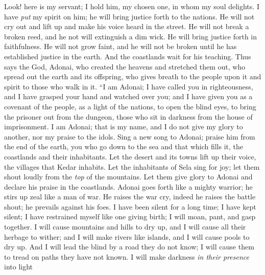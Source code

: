 \begin{biblechapter} %
 Look! here is my servant; I hold him, 
my chosen one, in whom my soul delights. 
I have \textit{put} my spirit on him; 
he will bring justice forth to the nations.
\verse He will not cry out and lift up 
and make his voice heard in the street.
\verse He will not break a broken reed, 
and he not will extinguish a dim wick. 
He will bring justice forth in faithfulness.
\verse He will not grow faint, 
and he will not be broken 
until he has established justice in the earth. 
And the coastlands wait for his teaching.
\verse Thus says the God, Adonai, 
who created the heavens 
and stretched them out, 
who spread out the earth and its offspring, 
who gives breath to the people upon it 
and spirit to those who walk in it.
\verse “I am Adonai; I have called you in righteousness, 
and I have grasped your hand and watched over you; 
and I have given you as a covenant of the people, 
as a light of the nations,
\verse to open the blind eyes, 
to bring the prisoner out from the dungeon, 
those who sit in darkness from the house of imprisonment.
\verse I am Adonai; that is my name,
\verse and I do not give my glory to another, 
nor my praise to the idols.
 Sing a new song to Adonai; 
praise him from the end of the earth, 
you who go down to the sea and that which fills it, 
the coastlands and their inhabitants.
\verse Let the desert and its towns lift up their voice, 
the villages that Kedar inhabits. 
Let the inhabitants of Sela sing for joy; 
let them shout loudly from the \textit{top} of the mountains.
\verse Let them give glory to Adonai 
and declare his praise in the coastlands.
\verse Adonai goes forth like a mighty warrior; 
he stirs up zeal like a man of war. 
He raises the war cry, indeed he raises the battle shout; 
he prevails against his foes.
\verse I have been silent for a long time; 
I have kept silent; 
I have restrained myself like one giving birth; 
I will moan, pant, and gasp together.
\verse I will cause mountains and hills to dry up, 
and I will cause all their herbage to wither; 
and I will make rivers like islands, 
and I will cause pools to dry up.
\verse And I will lead the blind by a road they do not know; 
I will cause them to tread on paths they have not known. 
I will make darkness \textit{in their presence} into light 

\end{biblechapter}
